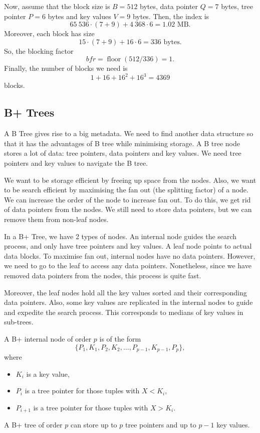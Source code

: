 \documentclass[a4paper, openany]{memoir}
\begin{document}
Now, assume that the block size is $B = 512$ bytes, data pointer $Q = 7$ bytes, tree pointer $P = 6$ bytes and key values $V = 9$ bytes. Then, the index is
\[65 \ 536 \cdot (7 + 9) + 4 \ 368 \cdot 6 = 1.02 \text{ MB}.\]
Moreover, each block has size
\[15 \cdot (7 + 9) + 16 \cdot 6 = 336 \text{ bytes}.\]
So, the blocking factor 
\[\textit{bfr} = \operatorname{floor}(512/336) = 1.\]
Finally, the number of blocks we need is
\[1 + 16 + 16^2 + 16^3 = 4369\]
blocks.

\subsection{B+ Trees}
A B Tree gives rise to a big metadata. We need to find another data structure so that it has the advantages of B tree while minimising storage. A B tree node stores a lot of data: tree pointers, data pointers and key values. We need tree pointers and key values to navigate the B tree. 

We want to be storage efficient by freeing up space from the nodes. Also, we want to be search efficient by maximising the fan out (the splitting factor) of a node. We can increase the order of the node to increase fan out. To do this, we get rid of data pointers from the nodes. We still need to store data pointers, but we can remove them from non-leaf nodes.

In a B+ Tree, we have 2 types of nodes. An internal node guides the search process, and only have tree pointers and key values. A leaf node points to actual data blocks. To maximise fan out, internal nodes have no data pointers. However, we need to go to the leaf to access any data pointers. Nonetheless, since we have removed data pointers from the nodes, this process is quite fast. 

Moreover, the leaf nodes hold all the key values sorted and their corresponding data pointers. Also, some key values are replicated in the internal nodes to guide and expedite the search process. This corresponds to medians of key values in sub-trees.

A B+ internal node of order $p$ is of the form
\[\{P_1, K_1, P_2, K_2, \dots, P_{p-1}, K_{p-1}, P_p\},\]
where
\begin{itemize}
    \item $K_i$ is a key value,
    \item $P_i$ is a tree pointer for those tuples with $X < K_i$,
    \item $P_{i+1}$ is a tree pointer for those tuples with $X > K_i$.
\end{itemize}
A B+ tree of order $p$ can store up to $p$ tree pointers and up to $p-1$ key values.
\end{document}
